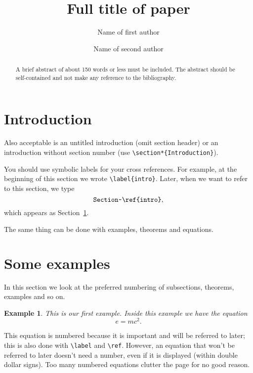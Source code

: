 \documentclass[11pt,reqno]{amsart}
\title[Short title of up to 45 letters]{Full title of paper}
\author{Name of first author}
\author{Name of second author}
\numberwithin{equation}{section}
\newtheorem{example}{Example}[section]  %
\begin{document}

\begin{abstract}
  A brief abstract of about 150 words or less must be included. The
  abstract should be self-contained and not make any reference to the
  bibliography.
\end{abstract}

\maketitle %

\section{Introduction}\label{intro}

Also acceptable is an untitled introduction (omit section header)
or an introduction without section number 
(use \verb+\section*{Introduction}+).

You should use symbolic labels for your cross references.  For
example, at the beginning of this section we wrote
\verb+\label{intro}+.  Later, when we want to refer to this section,
we type $$\verb+Section~\ref{intro}+,$$ which appears as
Section~\ref{intro}.

The same thing can be done with examples, theorems and equations.

\section{Some examples}\label{examples}

In this section we look at the preferred numbering of subsections,
theorems, examples and so on.  

\begin{example}\rm
\label{ex1}
This is our first example.  Inside this example we have the equation
\begin{equation}
\label{einstein}
e=mc^2.
\end{equation}
\end{example}

This equation is numbered because it is important and will be referred
to later; this is also done with \verb+\label+ and \verb+\ref+. 
However, an equation that won't be referred to later
doesn't need a number, even if it is displayed (within double dollar
signs).  Too many numbered equations clutter the page for no good reason.
\end{document}

